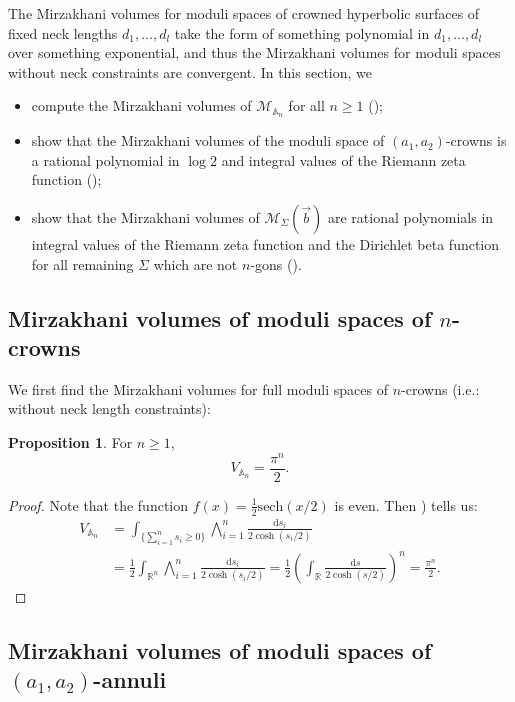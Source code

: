 \documentclass{amsart}
\newcommand{\RR}{\mathbb{R}}
\theoremstyle{definition}
\newtheorem{proposition}{Proposition}[section]
\begin{document}
The Mirzakhani volumes for moduli spaces of crowned hyperbolic surfaces of fixed neck lengths $d_1,\ldots,d_l$ take the form of something polynomial in $d_1,\ldots,d_l$ over something exponential, and thus the Mirzakhani volumes for moduli spaces without neck constraints are convergent. In this section, we
\begin{itemize}
    \item compute the Mirzakhani volumes of $\mathcal{M}_{\mathbb{A}_n}$ for all $n\geqslant1$ ();
    \item show that the Mirzakhani volumes of the moduli space of $(a_1,a_2)$-crowns is a rational polynomial in $\log2$ and  integral values of the Riemann zeta function ();
    \item show that the Mirzakhani volumes of $\mathcal{M}_{\Sigma}(\vec{b})$ are rational polynomials in integral values of the Riemann zeta function and the Dirichlet beta function for all remaining $\Sigma$ which are not $n$-gons ().
\end{itemize}  



\subsection{Mirzakhani volumes of moduli spaces of $n$-crowns} 

We first find the Mirzakhani volumes for full moduli spaces of $n$-crowns (i.e.: without neck length constraints):
\begin{proposition}
\label{thm:crownfullvol}
For $n \geqslant  1$,
\[
V_{\mathbb{A}_{n}}= \frac{\pi^n}{2}.
\]
\end{proposition}

\begin{proof}
Note that the function $f(x) = \frac{1}{2}\text{sech}(x/2)$ is even. Then \cite[Equation~3.511(1)]{MR2360010}) tells us:
\begin{align*}
V_{\mathbb{A}_{n}} &= \int_{\{\sum_{i=1}^n s_i\geqslant0\}} \bigwedge_{i=1}^n\frac{\mathrm{d}s_i}{ 2\cosh (s_i/2)} \\&= \frac{1}{2}\int_{\RR^n} \bigwedge_{i=1}^n\frac{\mathrm{d}s_i}{ 2\cosh (s_i/2)} = \frac{1}{2}\left(\int_\RR\frac{\mathrm{d}s}{2\cosh(s/2)}\right)^n = \frac{\pi^n}{2}. 
\end{align*}    
\end{proof}


\subsection{Mirzakhani volumes of moduli spaces of $(a_1,a_2)$-annuli}
\label{sec:vol-annuli}
\end{document}
